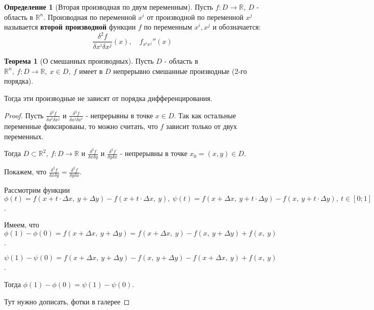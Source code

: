 \documentclass{report}
\theoremstyle{definition}
\newtheorem{definition}{Определение}[section]
\newtheorem{theorem}{Теорема}[section]
\begin{document}
\begin{definition}[Вторая производная по двум переменным]
  Пусть $f:D\rightarrow\mathbb{R}, \ D$ - область в $\mathbb{R}^n$. Производная по переменной $x^i$ от производной по переменной $x^j$ называется \textbf{второй производной} функции $f$ по переменным $x^i, x^j$ и обозначается:
  \begin{equation*}
    \frac{\delta^2 f}{\delta x^i \delta x^j}(x), \quad f_{x^ix^j}''(x)
  \end{equation*}
\end{definition}

\begin{theorem}[О смешанных производных]
  Пусть $D$ - область в $\mathbb{R}^n, \ f: D\rightarrow\mathbb{R}, \ x \in D, \ f$ имеет в $D$ непрерывно смешанные производные (2-го порядка).

  Тогда эти производные не зависят от порядка дифференцирования.
\end{theorem}

\begin{proof}
  Пусть $\frac{\delta^2 f}{\delta x^i \delta x^j}$ и $\frac{\delta^2 f}{\delta x^j \delta x^i}$ - непрерывны в точке $x \in D$. Так как остальные переменные фиксированы, то можно считать, что $f$ зависит только от двух переменных.

  Тогда $D\subset\mathbb{R}^2, \ f:D\rightarrow\mathbb{R}$ и $\frac{\delta^2 f}{\delta x \delta y}$ и $\frac{\delta^2 f}{\delta y \delta x}$ - непрерывны в точке $x_0 = (x,y) \in D$.

  Покажем, что $\frac{\delta^2 f}{\delta x \delta y} = \frac{\delta^2 f}{\delta y \delta x}$.

  Рассмотрим функции $\phi(t) = f(x+t\cdot\Delta x, \ y + \Delta y) - f(x+t\cdot\Delta x, \ y), \ \psi(t) = f(x + \Delta x, \ y + t\cdot\Delta y) - f(x, \ y + t \cdot \Delta y), \ t \in [0;1]$.

  Имеем, что $\phi(1) - \phi(0) = f(x + \Delta x, \ y + \Delta y) = f(x + \Delta x, \ y) - f(x, \ y + \Delta y) + f(x, \ y)$.

  $\psi(1) - \psi(0) = f(x + \Delta x, \ y + \Delta y) - f(x, \ y + \Delta y) - f(x + \Delta x, \ y) + f(x, \ y)$.

  Тогда $\phi(1) - \phi(0) = \psi(1) - \psi(0)$.

  Тут нужно дописать, фотки в галерее
\end{proof}
\end{document}
